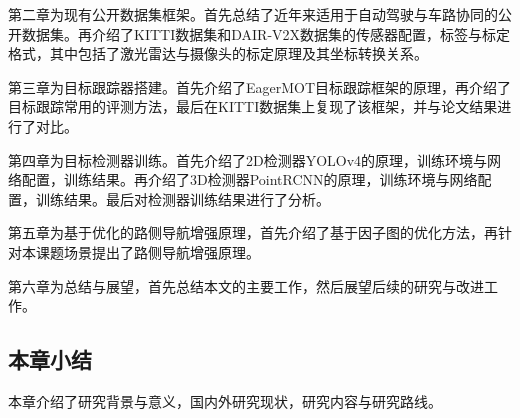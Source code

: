 第二章为现有公开数据集框架。首先总结了近年来适用于自动驾驶与车路协同的公开数据集。再介绍了KITTI数据集和DAIR-V2X数据集的传感器配置，标签与标定格式，其中包括了激光雷达与摄像头的标定原理及其坐标转换关系。

第三章为目标跟踪器搭建。首先介绍了EagerMOT目标跟踪框架的原理，再介绍了目标跟踪常用的评测方法，最后在KITTI数据集上复现了该框架，并与论文结果进行了对比。

第四章为目标检测器训练。首先介绍了2D检测器YOLOv4的原理，训练环境与网络配置，训练结果。再介绍了3D检测器PointRCNN的原理，训练环境与网络配置，训练结果。最后对检测器训练结果进行了分析。

第五章为基于优化的路侧导航增强原理，首先介绍了基于因子图的优化方法，再针对本课题场景提出了路侧导航增强原理。

第六章为总结与展望，首先总结本文的主要工作，然后展望后续的研究与改进工作。

\subsection{本章小结}

本章介绍了研究背景与意义，国内外研究现状，研究内容与研究路线。